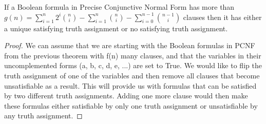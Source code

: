 \documentclass[runningheads,a4paper]{llncs}
\begin{document}
\begin{theorem}\normalfont

If a Boolean formula in Precise Conjunctive Normal Form has more than $g(n) = \sum_{i=1}^{n} 2^{i} \binom{n} {i} - \sum_{i=1}^{n} \binom{n} {i} - \sum_{i=0}^{n-1} \binom{n-1} {i} $ clauses then it has either a unique satisfying truth assignment or no satisfying truth assignment.
\begin{proof}

We can assume that we are starting with the Boolean formulas in PCNF from the previous theorem with f(n) many clauses, and that the variables in their uncomplemented forms (a, b, c, d, e, ...) are set to True. We would like to flip the truth assignment of one of the variables and then remove all clauses that become unsatisfiable as a result. This will provide us with formulas that can be satisfied by two different truth assignments. Adding one more clause would then make these formulas either satisfiable by only one truth assignment or unsatisfiable by any truth assignment. 


\end{proof}
\end{theorem}
\end{document}
